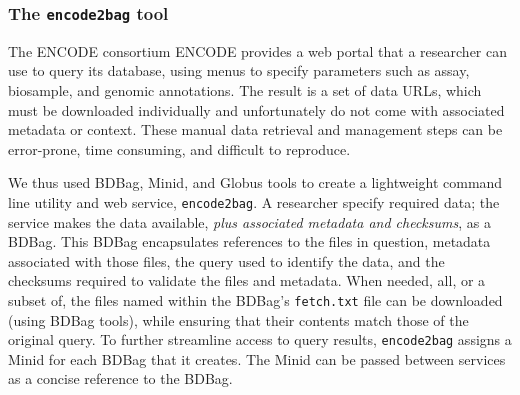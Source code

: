 \documentclass[11pt]{article}
\begin{document}
\subsubsection{The \texttt{encode2bag} tool}

The 
ENCODE consortium 
ENCODE provides a web portal that a researcher can use to query its database,
using menus to specify parameters such as assay, biosample, and genomic annotations.
The result is a set of data URLs,
which must be downloaded individually and unfortunately do not come with associated metadata or context.
These manual data retrieval and management steps can be error-prone,
time consuming, and difficult to reproduce.

We thus used BDBag, Minid, and Globus tools to create a lightweight command line utility and web service, \texttt{encode2bag}.
A researcher %
specify required data;
the service makes the data available,
\emph{plus associated metadata and checksums}, as a BDBag.
This BDBag encapsulates references to the files in question, metadata associated with those files, 
the query used to identify the data, and the checksums required to validate the files and metadata.
When needed, all, or a subset of, the files named within the BDBag's \texttt{fetch.txt} file can be downloaded
(using BDBag tools), while ensuring that their contents match those of the original query.
To further streamline access to query results, \texttt{encode2bag} assigns a Minid for each BDBag that it creates.
The Minid can be passed between services as a concise reference to the BDBag.
\end{document}
